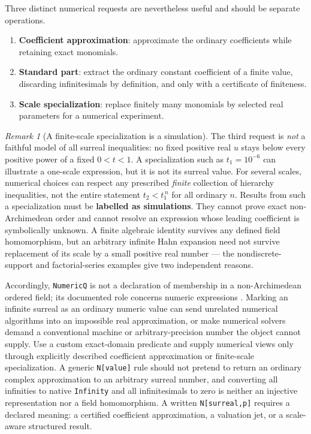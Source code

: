 \documentclass[11pt,letterpaper]{article}
\numberwithin{equation}{section}
\theoremstyle{definition}
\theoremstyle{remark}
\newtheorem{remark}[theorem]{Remark}
\begin{document}
Three distinct numerical requests are nevertheless useful and should be separate
operations.
\begin{enumerate}
\item \textbf{Coefficient approximation}: approximate the ordinary coefficients
while retaining exact monomials.
\item \textbf{Standard part}: extract the ordinary constant coefficient of a
finite value, discarding infinitesimals by definition, and only with a
certificate of finiteness.
\item \textbf{Scale specialization}: replace finitely many monomials by selected
real parameters for a numerical experiment.
\end{enumerate}

\begin{remark}[A finite-scale specialization is a simulation]
\label{cas:rem-simulation}
The third request is \emph{not} a faithful model of all surreal inequalities: no
fixed positive real $u$ stays below every positive power of a fixed $0<t<1$.
A specialization such as $t_1=10^{-6}$ can illustrate a one-scale expression,
but it is not its surreal value. For several scales, numerical choices can
respect any prescribed \emph{finite} collection of hierarchy inequalities, not
the entire statement $t_2<t_1^{\,n}$ for all ordinary $n$. Results from such a
specialization must be \textbf{labelled as simulations}. They cannot prove exact
non-Archimedean order and cannot resolve an expression whose leading coefficient
is symbolically unknown. A finite algebraic identity survives any defined field
homomorphism, but an arbitrary infinite Hahn expansion need not survive
replacement of its scale by a small positive real number --- the nondiscrete-support
and factorial-series examples give two independent reasons.
\end{remark}

Accordingly, \texttt{NumericQ} is not a declaration of membership in a
non-Archimedean ordered field; its documented role concerns numeric expressions
\cite{cas:WLNumericQ}. Marking an infinite surreal as an ordinary numeric value
can send unrelated numerical algorithms into an impossible real approximation,
or make numerical solvers demand a conventional machine or arbitrary-precision
number the object cannot supply. Use a custom exact-domain predicate and supply
numerical views only through explicitly described coefficient approximation or
finite-scale specialization. A generic \texttt{N[value]} rule should not pretend
to return an ordinary complex approximation to an arbitrary surreal number, and
converting all infinities to native \texttt{Infinity} and all infinitesimals to
zero is neither an injective representation nor a field homomorphism. A written
\texttt{N[surreal,p]} requires a declared meaning: a certified coefficient
approximation, a valuation jet, or a scale-aware structured result.
\end{document}
